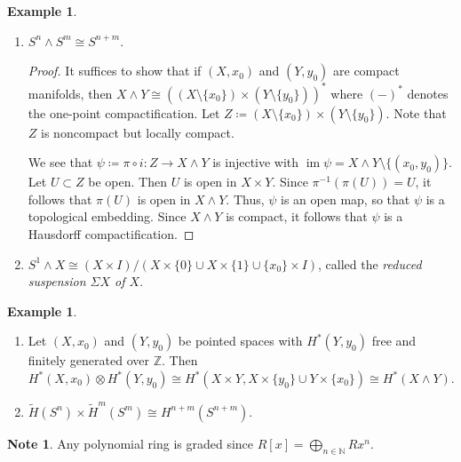 \documentclass[10pt,letterpaper,cm]{nupset}
\theoremstyle{definition}
\newtheorem{exmp}[definition]{Example}
\newtheorem{note}[definition]{Note}
\theoremstyle{theorem}
\theoremstyle{remark}
\newcommand{\N}{\mathbb N}
\newcommand{\Z}{\mathbb Z}
\newcommand{\1}{\mathbb{1}}
\newcommand{\0}{\vec 0}
\DeclareMathOperator{\im}{im}
\begin{document}
\begin{exmp} $ $
\begin{enumerate}
\item $S^n \wedge  S^m \cong S^{n+m}$.
\begin{proof}
 It suffices to show that if $(X, x_0)$ and $(Y, y_0)$ are compact manifolds, then $X \wedge Y \cong ((X \setminus \{x_0\}) \times (Y \setminus \{y_0\}))^{\ast}$ where $({-})^{\ast}$ denotes the one-point compactification. Let $Z\coloneqq  (X \setminus \{x_0\}) \times (Y \setminus \{y_0\})$. Note that $Z$ is noncompact but locally compact. 
 
 We see that $\psi \coloneqq  \pi \circ i : Z \to X \wedge Y$ is injective with $\im{\psi} = X \wedge Y \setminus \{(x_0, y_0)\}$. Let $U \subset Z$ be open. Then $U$ is open in $X \times Y$.  Since $\pi^{-1}(\pi(U)) = U$, it follows that $\pi(U)$ is open in $X \wedge Y$. Thus, $\psi$ is an open map, so that $\psi$ is a topological embedding. Since $X \wedge Y$ is compact, it follows that $\psi$ is a Hausdorff compactification. 
\end{proof}
\item $S^1 \wedge X \cong (X\times I)/(X\times \{0\}\cup X\times \{1\}\cup \{x_{0}\}\times I)$, called the \textit{reduced suspension $\Sigma{X}$ of $X$}.
\end{enumerate}
\end{exmp}

\begin{exmp} $ $
\begin{enumerate}
\item Let $(X, x_0)$ and $(Y, y_0)$ be pointed spaces with $H^{\ast}(Y, y_0)$ free and finitely generated over $\Z$. Then $H^{\ast}(X, x_0) \otimes H^{\ast}(Y, y_0) \cong H^{\ast}(X \times Y, X \times \{y_0\} \cup Y \times \{x_0\}) \cong H^{\ast}(X \wedge Y)    .$
\item  $\widetilde{H}(S^n) \times \widetilde{H}^m(S^m) \cong H^{n+m}(S^{n+m})$.
\end{enumerate}
\end{exmp}

\begin{note}
Any polynomial ring is graded since $R[x] = \bigoplus_{n \in \N} Rx^n$.
\end{note}
\end{document}
